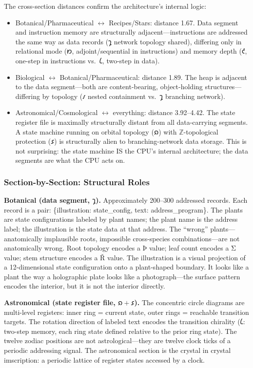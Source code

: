 \documentclass[12pt,a4paper]{article}
\begin{document}
The cross-section distances confirm the architecture's internal logic:

\begin{itemize}
    \item Botanical/Pharmaceutical $\leftrightarrow$ Recipes/Stars: distance 1.67. Data segment and instruction memory are structurally adjacent---instructions are addressed the same way as data records ($𐑡$ network topology shared), differing only in relational mode ($𐑽$, adjoint/sequential in instructions) and memory depth ($𐑒$, one-step in instructions vs.\ $𐑖$, two-step in data).
    \item Biological $\leftrightarrow$ Botanical/Pharmaceutical: distance 1.89. The heap is adjacent to the data segment---both are content-bearing, object-holding structures---differing by topology ($𐑥$ nested containment vs.\ $𐑡$ branching network).
    \item Astronomical/Cosmological $\leftrightarrow$ everything: distance 3.92--4.42. The state register file is maximally structurally distant from all data-carrying segments. A state machine running on orbital topology ($𐑸$) with $\mathbb{Z}$-topological protection ($𐑭$) is structurally alien to branching-network data storage. This is not surprising: the state machine IS the CPU's internal architecture; the data segments are what the CPU acts on.
\end{itemize}

\subsubsection{Section-by-Section: Structural Roles}

\textbf{Botanical (data segment, $𐑡$).} Approximately 200--300 addressed records. Each record is a pair: \{illustration: state\_config, text: address\_program\}. The plants are state configurations labeled by plant names; the plant name is the address label; the illustration is the state data at that address. The ``wrong'' plants---anatomically implausible roots, impossible cross-species combinations---are not anatomically wrong. Root topology encodes a $\text{Þ}$ value; leaf count encodes a $\text{Σ}$ value; stem structure encodes a $\text{Ř}$ value. The illustration is a visual projection of a 12-dimensional state configuration onto a plant-shaped boundary. It looks like a plant the way a holographic plate looks like a photograph---the surface pattern encodes the interior, but it is not the interior directly.

\textbf{Astronomical (state register file, $𐑸 + 𐑭$).} The concentric circle diagrams are multi-level registers: inner ring = current state, outer rings = reachable transition targets. The rotation direction of labeled text encodes the transition chirality ($𐑖$: two-step memory, each ring state defined relative to the prior ring state). The twelve zodiac positions are not astrological---they are twelve clock ticks of a periodic addressing signal. The astronomical section is the crystal in crystal imscription: a periodic lattice of register states accessed by a clock.
\end{document}
